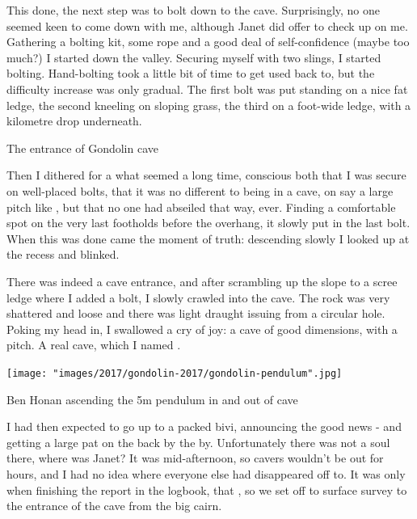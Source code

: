 This done, the next step was to bolt down to the cave. Surprisingly, no one seemed keen to come down with me, although Janet did offer to check up on me. Gathering a bolting kit, some rope and a good deal of self-confidence (maybe too much?) I started down the valley. Securing myself with two slings, I started bolting. Hand-bolting took a little bit of time to get used back to, but the difficulty increase was only gradual. The first bolt was put standing on a nice fat ledge, the second kneeling on sloping grass, the third on a foot-wide ledge, with a kilometre drop underneath.

\begin{marginfigure}
    \caption{The entrance of Gondolin cave }
    \label{}
\end{marginfigure}

Then I dithered for a what seemed a long time, conscious both that I was secure on well-placed bolts, that it was no different to being in a cave, on say a large pitch like , but that no one had abseiled that way, ever. Finding a comfortable spot on the very last footholds before the overhang, it slowly put in the last bolt. When this was done came the moment of truth: descending slowly I looked up at the recess and blinked.

There was indeed a cave entrance, and after scrambling up the slope to a scree ledge where I added a bolt, I slowly crawled into the cave. The rock was very shattered and loose and there was light draught issuing from a circular hole. Poking my head in, I swallowed a cry of joy: a cave of good dimensions, with a pitch. A real cave, which I named .

\begin{pagefigure}
\checkoddpage \ifoddpage \forcerectofloat \else \forceversofloat \fi
\centering
        \texttt{[image: "images/2017/gondolin-2017/gondolin-pendulum".jpg]}
     \label{gondolin pendulum}
    \caption{ Ben Honan ascending the 5m pendulum in and out of  cave }
\end{pagefigure}

I had then expected to go up to a packed bivi, announcing the good news - and getting a large pat on the back by the by. Unfortunately there was not a soul there, where was Janet? It was mid-afternoon, so cavers wouldn't be out for hours, and I had no idea where everyone else had disappeared off to. It was only when finishing the report in the logbook, that , so we set off to surface survey to the entrance of the cave from the big cairn. 

